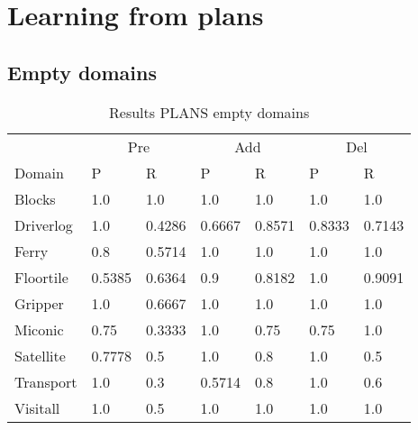 \documentclass[]{article}
\title{}
\author{}
\begin{document}
\maketitle

%

\section{Learning from plans}
\subsection{Empty domains}
\begin{table}[H]
	\caption{Results PLANS empty domains}
	\label{tab:results_plans_empty}
	\begin{center}
		\begin{tabular}{l|l|l|l|l|l|l|}
			 & \multicolumn{2}{|c|}{Pre} & \multicolumn{2}{|c|}{Add} & \multicolumn{2}{|c|}{Del}  \\ \cline{2-7}			 
			 Domain & P & R & P & R & P & R \\
			\hline
			Blocks & 1.0 & 1.0 & 1.0 & 1.0 & 1.0 & 1.0 \\
			Driverlog & 1.0 & 0.4286 & 0.6667 & 0.8571 & 0.8333 & 0.7143 \\
			Ferry & 0.8 & 0.5714 & 1.0 & 1.0 & 1.0 & 1.0 \\
			Floortile & 0.5385 & 0.6364 & 0.9 & 0.8182 & 1.0 & 0.9091 \\
			Gripper & 1.0 & 0.6667 & 1.0 & 1.0 & 1.0 & 1.0 \\
			Miconic & 0.75 & 0.3333 & 1.0 & 0.75 & 0.75 & 1.0 \\
			Satellite & 0.7778 & 0.5 & 1.0 & 0.8 & 1.0 & 0.5 \\
			Transport & 1.0 & 0.3 & 0.5714 & 0.8 & 1.0 & 0.6 \\
			Visitall & 1.0 & 0.5 & 1.0 & 1.0 & 1.0 & 1.0 \\
		\end{tabular}
	\end{center}	
\end{table}
\end{document}
